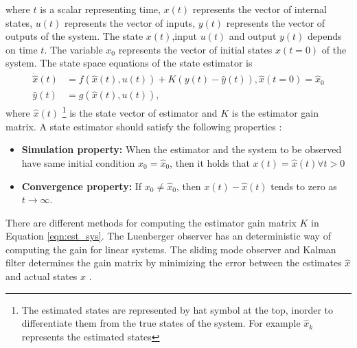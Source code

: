 where $t$ is a scalar representing time, $x(t)$ represents the vector of internal states, $u(t)$ represents the vector of inputs, $y(t)$ represents the vector of outputs of the system. The state $x(t)$,input $u(t)$ and output $y(t)$ depends on time $t$. The variable $x_0$ represents the vector of initial states $x(t=0)$ of the system. 
The state space equations of the state estimator is 
\begin{equation}
\begin{split}
\label{eqn:est_sys}
\dot{\hat{x}}(t) &= f(\hat{x}(t),u(t)) + K(y(t)-\hat{y}(t)) , \hat{x}(t=0) = \hat{x}_0  \\
\hat{y}(t) &= g(\hat{x}(t),u(t)),
\end{split}
\end{equation}
where $\hat{x}(t)$ \footnote{ The estimated states are represented by hat symbol at the top, inorder to differentiate them from the true states of the system. For example $\hat x_k$ represents the estimated states} is the state vector of estimator and $K$ is the estimator gain matrix.  A state estimator should satisfy the following properties \citep{gre01}:
\begin{itemize}
\item \textbf{Simulation property:} When the estimator and the system to be observed have same initial condition $x_0 = \hat{x}_0$, then it holds that $x(t) = \hat{x}(t) \forall t > 0 $
\item \textbf{Convergence property:} If $x_0 \neq \hat{x}_0$, then $x(t) - \hat{x}(t)$ tends to zero as $ t \rightarrow \infty $.
\end{itemize}

There are different methods for computing the estimator gain matrix $K$ in Equation \ref{eqn:est_sys}. The Luenberger observer has an deterministic way of computing the gain for linear systems. The sliding mode observer and Kalman filter determines the gain matrix by minimizing the error between the estimates $\hat{x}$ and actual states $x$ \citep{kha02}.